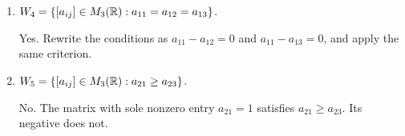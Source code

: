 \begin{enumerate}[label=\alph*)]
\item $W_4=\{[a_{ij}]\in M_3(\mathbb R):a_{11}=a_{12}=a_{13}\}$.

\begin{answer}
Yes. Rewrite the conditions as $a_{11}-a_{12}=0$ and
$a_{11}-a_{13}=0$, and apply the same criterion.
\end{answer}

\item $W_5=\{[a_{ij}]\in M_3(\mathbb R):a_{21}\ge a_{23}\}$.

\begin{answer}
No. The matrix with sole nonzero entry $a_{21}=1$ satisfies
$a_{21}\ge a_{23}$. Its negative does not.
\end{answer}
\end{enumerate}
